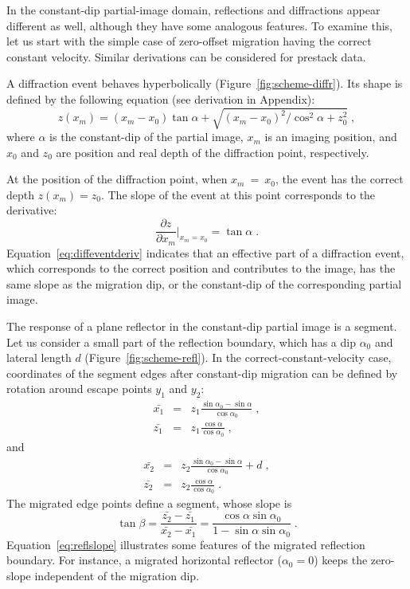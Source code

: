 
In the constant-dip partial-image domain, reflections and diffractions appear different as well, although they
have some analogous features. To examine this, let us start with the simple case of zero-offset migration
having the correct constant velocity. Similar derivations can be considered for prestack data.

A diffraction event behaves hyperbolically (Figure~\ref{fig:scheme-diffr}). Its shape is defined by
the following equation (see derivation in Appendix):
\begin{equation}
\label{eq:diffevent}
z(x_m)=(x_m - x_0) \tan \alpha + \sqrt {(x_m - x_0)^2 / \cos^2 \alpha + z^2_0}\;,
\end{equation}
where $\alpha$ is the constant-dip of the partial image, $x_m$ is an imaging position, and $x_0$ and $z_0$ are position and real depth 
of the diffraction point, respectively.

At the position of the diffraction point, when $x_m~=~x_0$, the event has the correct depth $z(x_m)=z_0$.
The slope of the event at this point corresponds to the derivative:
\begin{equation}
\label{eq:diffeventderiv}
\frac {\partial z }{\partial x_m} \vert_{x_m=x_0} = \tan \alpha\;.
\end{equation}
Equation~\ref{eq:diffeventderiv} indicates that an effective part of a diffraction event, which corresponds to the
correct position and contributes to the image, has the same slope as the migration dip, or the constant-dip of the corresponding partial image.

The response of a plane reflector in the constant-dip partial image is a segment. Let us consider
a small part of the reflection boundary, which has a dip $\alpha_0$ and lateral length $d$ (Figure~\ref{fig:scheme-refl}).
In the correct-constant-velocity case, coordinates of the segment edges after constant-dip migration can be defined by
rotation around escape points $y_1$ and $y_2$:
\begin{eqnarray}
\label{eq:p1x}
  \bar{x_1} & = & z_1 \frac{\sin \alpha_0 - \sin \alpha}{\cos \alpha_0}\;, \\
\label{eq:p1z}
  \bar{z_1} & = & z_1 \frac{\cos \alpha}{\cos \alpha_0}\;,
\end{eqnarray}
and
\begin{eqnarray}
\label{eq:p2x}
  \bar{x_2} & = & z_2 \frac{\sin \alpha_0 - \sin \alpha}{\cos \alpha_0} + d\;, \\
\label{eq:p2z}
  \bar{z_2} & = & z_2 \frac{\cos \alpha}{\cos \alpha_0}\;.
\end{eqnarray}
The migrated edge points define a segment, whose slope is
\begin{equation}
\label{eq:reflslope}
\tan \beta = \frac {\bar{z_2}-\bar{z_1}}{\bar{x_2} - \bar{x_1}} = \frac{\cos \alpha \sin \alpha_0}{1 - \sin \alpha \sin \alpha_0}\;.
\end{equation}
Equation~\ref{eq:reflslope} illustrates some features of the migrated reflection boundary. For instance, a migrated horizontal
reflector ($\alpha_0 = 0$) keeps the zero-slope independent of the migration dip.

